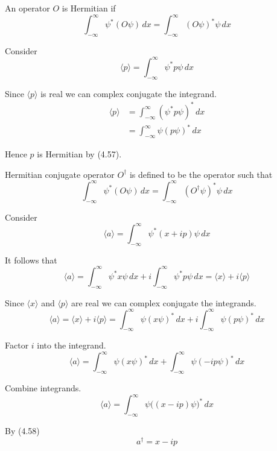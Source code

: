 


An operator $O$ is Hermitian if
\begin{equation*}
\int_{-\infty}^\infty\psi^*(O\psi)\,dx
=\int_{-\infty}^\infty(O\psi)^*\psi\,dx
\tag{4.57}
\end{equation*}

Consider
\begin{equation*}
\langle p\rangle=\int_{-\infty}^\infty\psi^*p\psi\,dx
\end{equation*}

Since $\langle p\rangle$ is real we can complex conjugate the integrand.
\begin{align*}
\langle p\rangle
&=\int_{-\infty}^\infty(\psi^*p\psi)^*\,dx
\\
&=\int_{-\infty}^\infty\psi(p\psi)^*\,dx
\end{align*}

Hence $p$ is Hermitian by (4.57).

\bigskip
Hermitian conjugate operator $O^\dag$ is defined to be the operator such that
\begin{equation*}
\int_{-\infty}^\infty\psi^*(O\psi)\,dx
=\int_{-\infty}^\infty(O^\dag\psi)^*\psi\,dx
\tag{4.58}
\end{equation*}

Consider
\begin{equation*}
\langle a\rangle=\int_{-\infty}^\infty\psi^*(x+ip)\psi\,dx
\end{equation*}

It follows that
\begin{equation*}
\langle a\rangle
=\int_{-\infty}^\infty\psi^*x\psi\,dx
+i\int_{-\infty}^\infty\psi^*p\psi\,dx
=\langle x\rangle+i\langle p\rangle
\end{equation*}

Since $\langle x\rangle$ and $\langle p\rangle$ are
real we can complex conjugate the integrands.
\begin{equation*}
\langle a\rangle=\langle x\rangle+i\langle p\rangle
=\int_{-\infty}^\infty\psi(x\psi)^*\,dx
+i\int_{-\infty}^\infty\psi(p\psi)^*\,dx
\end{equation*}

Factor $i$ into the integrand.
\begin{equation*}
\langle a\rangle
=\int_{-\infty}^\infty\psi(x\psi)^*\,dx
+\int_{-\infty}^\infty\psi(-ip\psi)^*\,dx
\end{equation*}

Combine integrands.
\begin{equation*}
\langle a\rangle
=\int_{-\infty}^\infty\psi\bigl((x-ip)\psi\bigr)^*\,dx
\end{equation*}

By (4.58)
\begin{equation*}
a^\dag=x-ip
\end{equation*}


